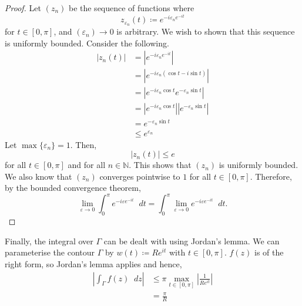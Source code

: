 \documentclass[a4paper]{article}
\newcommand*\diff{\mathop{}\!d} %
\theoremstyle{definition}
\begin{document}
\begin{proof}
    Let $(z_n)$ be the sequence of functions where
    \begin{equation*}
        z_{\varepsilon_n}(t) \coloneq e^{-i\varepsilon_n e^{-it}}
    \end{equation*}
    for $t \in [0, \pi]$,
    and $(\varepsilon_n) \to 0$ is arbitrary.
    We wish to shown that this sequence is uniformly bounded.
    Consider the following.
    \begin{align*}
        |z_n(t)| & = \left|e^{-i\varepsilon_n e^{-it}}\right|                                        \\
                 & = \left|e^{-i\varepsilon_n (\cos t - i\sin t)}\right|                             \\
                 & = \left|e^{-i\varepsilon_n \cos t} e^{-\varepsilon_n \sin t}\right|               \\
                 & = \left|e^{-i\varepsilon_n \cos t}\right|  \left|e^{-\varepsilon_n \sin t}\right| \\
                 & = e^{-\varepsilon_n \sin t}                                                       \\
                 & \leq e^{\varepsilon_n}
    \end{align*}
    Let $\max \{\varepsilon_n\} = 1$.
    Then,
    \begin{equation*}
        |z_n(t)| \leq e
    \end{equation*}
    for all $t \in [0, \pi]$ and for all $n \in \mathbb{N}$.
    This shows that $(z_n)$ is uniformly bounded.
    We also know that $(z_n)$ converges pointwise to $1$ for all $t \in [0, \pi]$.
    Therefore, by the bounded convergence theorem,
    \begin{equation*}
        \lim_{\varepsilon \to 0} \int_{0}^{\pi} e^{-i\varepsilon e^{-it}} \diff t = \int_{0}^{\pi} \lim_{\varepsilon \to 0} e^{-i\varepsilon e^{-it}} \diff t.
    \end{equation*}
\end{proof}
Finally, the integral over $\Gamma$ can be dealt with using Jordan's lemma.
We can parameterise the contour $\Gamma$ by $w(t) \coloneq Re^{it}$ with $t \in [0, \pi]$.
$f(z)$ is of the right form, so Jordan's lemma applies and hence,
\begin{align*}
    \left| \int_{\Gamma} f(z) \diff z \right| & \leq \pi \max_{t \in [0,\pi]} \left|\frac{1}{Re^{it}}\right| \\
                                              & = \frac{\pi}{R}
\end{align*}
\end{document}
